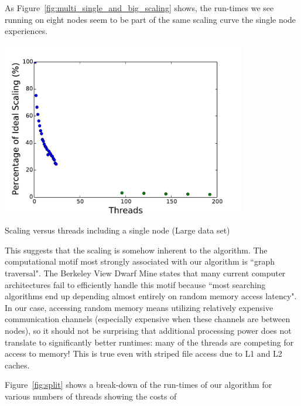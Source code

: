 \documentclass{article}
\begin{document}
As Figure~\ref{fig:multi_single_and_big_scaling} shows, the run-times we see running on eight nodes seem to be part of the same scaling curve the single node experiences.

\begin{minipage}{\linewidth}
  \captionsetup{type=figure}
  \begin{center}
  \includegraphics[width=0.8\textwidth]{MultiANDSingleBIGScaling.pdf}
  \end{center}
  \caption{Scaling versus threads including a single node (Large data set)} \label{fig:multi_single_and_big_scaling}
\end{minipage}

This suggests that the scaling is somehow inherent to the algorithm. The computational motif most strongly associated with our algorithm is ``graph traversal". The Berkeley View Dwarf Mine states that many current computer architectures fail to efficiently handle this motif because ``most searching algorithms end up depending almost entirely on random memory access latency". In our case, accessing random memory means utilizing relatively expensive communication channels (especially expensive when these channels are between nodes), so it should not be surprising that additional processing power does not translate to significantly better runtimes: many of the threads are competing for access to memory! This is true even with striped file access due to L1 and L2 caches.

Figure~\ref{fig:split} shows a break-down of the run-times of our algorithm for various numbers of threads showing the costs of
\end{document}
